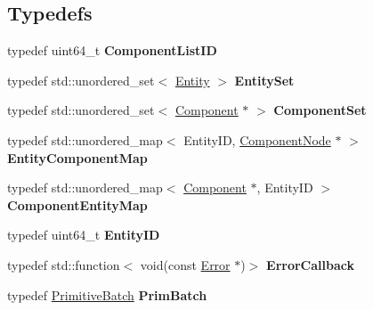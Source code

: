\subsection*{Typedefs}
\begin{DoxyCompactItemize}
\item 
\mbox{\label{namespacenta_a2b7b647fe83786540b5e342a4a0474fa}} 
typedef uint64\+\_\+t {\bfseries Component\+List\+ID}
\item 
\mbox{\label{namespacenta_ab1a4e1926834dedfce30d0f6ed301fbf}} 
typedef std\+::unordered\+\_\+set$<$ \hyperlink{classnta_1_1Entity}{Entity} $>$ {\bfseries Entity\+Set}
\item 
\mbox{\label{namespacenta_a42c93a10ef59c9dbc5d2b24fb2a93b39}} 
typedef std\+::unordered\+\_\+set$<$ \hyperlink{classnta_1_1Component}{Component} $\ast$ $>$ {\bfseries Component\+Set}
\item 
\mbox{\label{namespacenta_a5bbe888781155ddeee0af5822e45fa16}} 
typedef std\+::unordered\+\_\+map$<$ Entity\+ID, \hyperlink{structnta_1_1ComponentNode}{Component\+Node} $\ast$ $>$ {\bfseries Entity\+Component\+Map}
\item 
\mbox{\label{namespacenta_a941d400edfbb84e895e33289b8912f26}} 
typedef std\+::unordered\+\_\+map$<$ \hyperlink{classnta_1_1Component}{Component} $\ast$, Entity\+ID $>$ {\bfseries Component\+Entity\+Map}
\item 
\mbox{\label{namespacenta_aa68b3663f658b73faa34f47acbe800b2}} 
typedef uint64\+\_\+t {\bfseries Entity\+ID}
\item 
\mbox{\label{namespacenta_a1f5715ee41c7a9174d2cc404fdb8556a}} 
typedef std\+::function$<$ void(const \hyperlink{structnta_1_1Error}{Error} $\ast$)$>$ {\bfseries Error\+Callback}
\item 
\mbox{\label{namespacenta_acee44e1bbf4f2431ec51a26e231691e5}} 
typedef \hyperlink{classnta_1_1PrimitiveBatch}{Primitive\+Batch} {\bfseries Prim\+Batch}
\end{DoxyCompactItemize}
